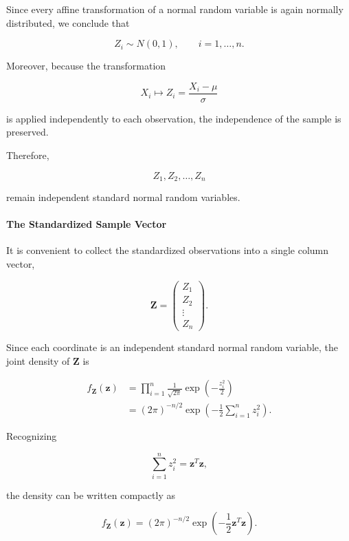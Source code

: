 \documentclass[11pt]{article}
\begin{document}
\begin{mdframed}[
		linewidth=0.8pt,
		roundcorner=6pt,
		backgroundcolor=gray!5,
		linecolor=gray!60,
		innertopmargin=10pt,
		innerbottommargin=10pt,
		innerleftmargin=10pt,
		innerrightmargin=10pt
		]
		Since every affine transformation of a normal random variable is again
		normally distributed, we conclude that
		
		\[
		\boxed{
			Z_i\sim N(0,1),
			\qquad
			i=1,\ldots,n.
		}
		\]
		
		Moreover, because the transformation
		
		\[
		X_i
		\longmapsto
		Z_i
		=
		\frac{X_i-\mu}{\sigma}
		\]
		
		is applied independently to each observation, the independence of the
		sample is preserved.
		
		Therefore,
		
		\[
		Z_1,Z_2,\ldots,Z_n
		\]
		
		remain independent standard normal random variables.
		
		\vspace{0.3cm}
		
		\paragraph{The Standardized Sample Vector}
		
		It is convenient to collect the standardized observations into a single
		column vector,
		
		\[
		\mathbf Z
		=
		\begin{pmatrix}
			Z_1\\
			Z_2\\
			\vdots\\
			Z_n
		\end{pmatrix}.
		\]
		
		Since each coordinate is an independent standard normal random variable,
		the joint density of $\mathbf Z$ is
		
		\[
		\begin{aligned}
			f_{\mathbf Z}(\mathbf z)
			&=
			\prod_{i=1}^{n}
			\frac1{\sqrt{2\pi}}
			\exp\!\left(-\frac{z_i^2}{2}\right)
			\\[0.3cm]
			&=
			(2\pi)^{-n/2}
			\exp\!\left(
			-\frac12
			\sum_{i=1}^{n}z_i^2
			\right).
		\end{aligned}
		\]
		
		Recognizing
		
		\[
		\sum_{i=1}^{n}z_i^2
		=
		\mathbf z^T\mathbf z,
		\]
		
		the density can be written compactly as
		
		\[
		\boxed{
			f_{\mathbf Z}(\mathbf z)
			=
			(2\pi)^{-n/2}
			\exp\!\left(
			-\frac12
			\mathbf z^T\mathbf z
			\right).
		}
		\]
		

\end{mdframed}
\end{document}
